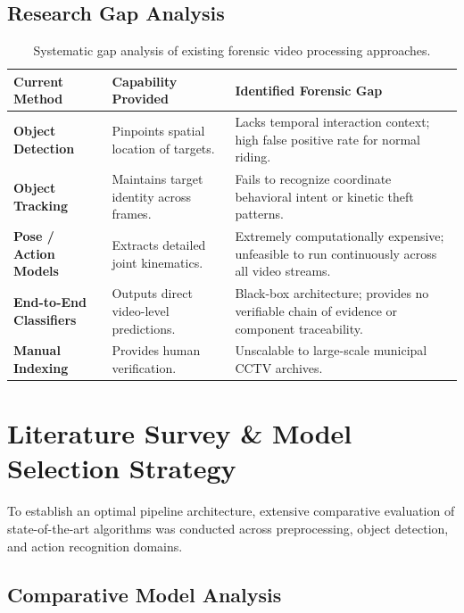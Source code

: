 \documentclass[11pt, a4paper]{article}
\begin{document}
\subsection{Research Gap Analysis}
\begin{table}[H]
\centering
\small
\renewcommand{\arraystretch}{1.3}
\begin{tabularx}{\textwidth}{|>{\hsize=0.25\hsize\bfseries}X|>{\hsize=0.35\hsize}X|>{\hsize=0.4\hsize}X|}
\hline
\textbf{Current Method} & \textbf{Capability Provided} & \textbf{Identified Forensic Gap} \\
\hline
Object Detection & Pinpoints spatial location of targets. & Lacks temporal interaction context; high false positive rate for normal riding. \\
\hline
Object Tracking & Maintains target identity across frames. & Fails to recognize coordinate behavioral intent or kinetic theft patterns. \\
\hline
Pose / Action Models & Extracts detailed joint kinematics. & Extremely computationally expensive; unfeasible to run continuously across all video streams. \\
\hline
End-to-End Classifiers & Outputs direct video-level predictions. & Black-box architecture; provides no verifiable chain of evidence or component traceability. \\
\hline
Manual Indexing & Provides human verification. & Unscalable to large-scale municipal CCTV archives. \\
\hline
\end{tabularx}
\caption{Systematic gap analysis of existing forensic video processing approaches.}
\end{table}

\section{Literature Survey \& Model Selection Strategy}

To establish an optimal pipeline architecture, extensive comparative evaluation of state-of-the-art algorithms was conducted across preprocessing, object detection, and action recognition domains.

\subsection{Comparative Model Analysis}
\end{document}
